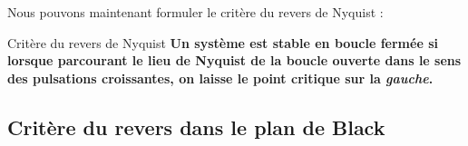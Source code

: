 Nous pouvons maintenant formuler le critère du revers de Nyquist :

\begin{criteria}{Critère du revers de Nyquist}
\textbf{Un système est stable en boucle fermée si lorsque parcourant 
        le lieu de Nyquist de la boucle ouverte dans le sens des 
        pulsations croissantes, on laisse le point critique sur la 
        \emph{gauche}.}
\end{criteria}

\newpage
\subsection{Critère du revers dans le plan de Black}
\acpl
